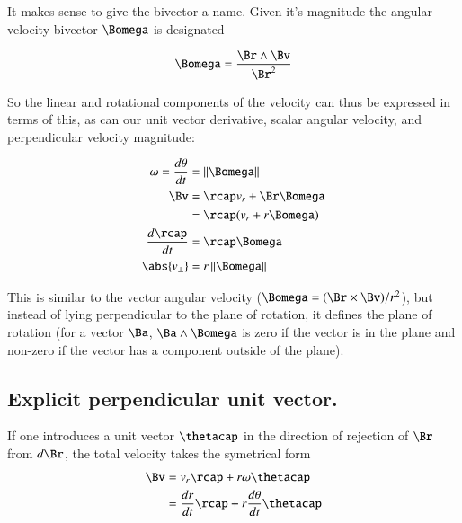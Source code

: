 \documentclass{article}
\newcommand{\dt}[1]{\frac{d {#1}}{dt}}
\newcommand{\Norm}[1]{\left\lVert{#1}\right\rVert}
\begin{document}
It makes sense to give the bivector a name.  Given it's magnitude the 
angular velocity bivector $\Bomega$ is designated

\[
\Bomega = \frac{ \Br \wedge \Bv }{\Br^2} 
\]

So the linear and rotational components of the velocity can thus be expressed in terms of this, as can our
unit vector derivative, scalar angular velocity, and perpendicular velocity magnitude:

\begin{align*}
\omega = \dt{\theta} &= \Norm{ \Bomega } \\
\Bv &= \rcap v_r + \Br \Bomega \\
    &= \rcap( v_r + r \Bomega ) \\
\dt{\rcap} &= \rcap \Bomega \\
\abs{v_{\perp}} &= r \Norm{ \Bomega } \\
\end{align*}

This is similar to the vector angular velocity ($\Bomega = (\Br \times \Bv)/r^2$), but instead of lying perpendicular to the
plane of rotation, it defines the plane of rotation (for a vector $\Ba$, $\Ba \wedge \Bomega$ is zero if the vector is in the plane and non-zero if the vector has a component outside of the plane).

%
%
%

\subsection{Explicit perpendicular unit vector.}

If one introduces a unit vector $\thetacap$ in the direction of rejection of $\Br$ from $d\Br$, the total velocity takes the symetrical form
\begin{align*}
\Bv 
   &= v_r\rcap + r\omega\thetacap \\
   &= \dt{r}\rcap + r\dt{\theta}\thetacap \\
\end{align*}
\end{document}
